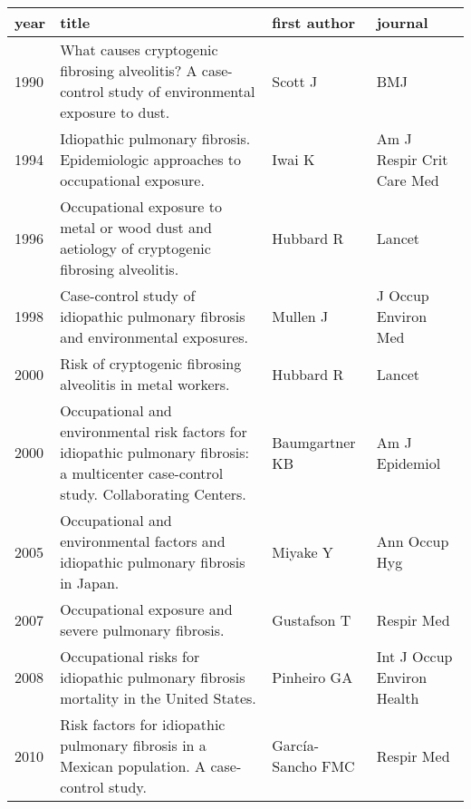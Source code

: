 \documentclass[a4paper,12pt]{article}
\begin{document}
\begin{table}
    \label{table:papers}
    \begin{tabular}{lp{6cm}ll}
    \textbf{year} & \textbf{title} &      \textbf{first author} &        \textbf{journal} \\
    \midrule
    1990    &   What causes cryptogenic fibrosing alveolitis? A case-control study of environmental exposure to dust. &                    Scott J &                         BMJ \\
    1994    &                                                        Idiopathic pulmonary fibrosis. Epidemiologic approaches to occupational exposure. &                     Iwai K &   Am J Respir Crit Care Med \\
    1996    &                                           Occupational exposure to metal or wood dust and aetiology of cryptogenic fibrosing alveolitis. &                  Hubbard R &                      Lancet \\
    1998    &                                                         Case-control study of idiopathic pulmonary fibrosis and environmental exposures. &                   Mullen J &         J Occup Environ Med \\
    2000    &                                                                               Risk of cryptogenic fibrosing alveolitis in metal workers. &                  Hubbard R &                      Lancet \\
    2000    &  Occupational and environmental risk factors for idiopathic pulmonary fibrosis: a multicenter case-control study. Collaborating Centers. &             Baumgartner KB &              Am J Epidemiol \\
    2005    &                                                       Occupational and environmental factors and idiopathic pulmonary fibrosis in Japan. &                   Miyake Y &               Ann Occup Hyg \\
    2007    &                                                                                     Occupational exposure and severe pulmonary fibrosis. &                Gustafson T &                  Respir Med \\
    2008    &                                                     Occupational risks for idiopathic pulmonary fibrosis mortality in the United States. &                Pinheiro GA &  Int J Occup Environ Health \\
    2010    &                                            Risk factors for idiopathic pulmonary fibrosis in a Mexican population. A case-control study. &  García-Sancho FMC &                  Respir Med \\

\end{tabular}
\end{table}
\end{document}
